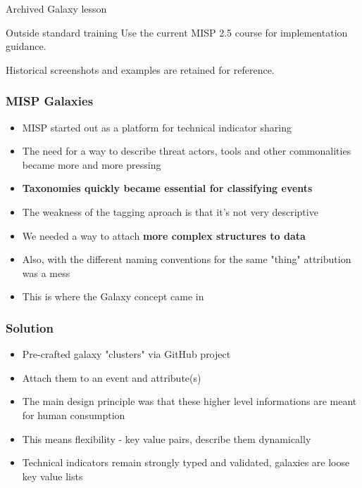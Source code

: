 
\begin{frame}[t,plain]
\titlepage
\end{frame}
\begin{frame}{Archived Galaxy lesson}
\begin{alertblock}{Outside standard training}
Use the current MISP 2.5 course for implementation guidance.
\end{alertblock}
Historical screenshots and examples are retained for reference.
\end{frame}

\begin{frame}
\frametitle{MISP Galaxies}
    \begin{itemize}
    \item MISP started out as a platform for technical indicator sharing
    \item The need for a way to describe threat actors, tools and other commonalities became more and more pressing
    \item {\bf Taxonomies quickly became essential for classifying events}
    \item The weakness of the tagging aproach is that it's not very descriptive
    \item We needed a way to attach {\bf more complex structures to data}
    \item Also, with the different naming conventions for the same "thing" attribution was a mess
    \item This is where the Galaxy concept came in
    \end{itemize}
\end{frame}


\begin{frame}
\frametitle{Solution}
    \begin{itemize}
        \item Pre-crafted galaxy "clusters" via GitHub project
        \item Attach them to an event and attribute(s)
        \item The main design principle was that these higher level informations are meant for human consumption
        \item This means flexibility - key value pairs, describe them dynamically
        \item Technical indicators remain strongly typed and validated, galaxies are loose key value lists
    \end{itemize}
\end{frame}


